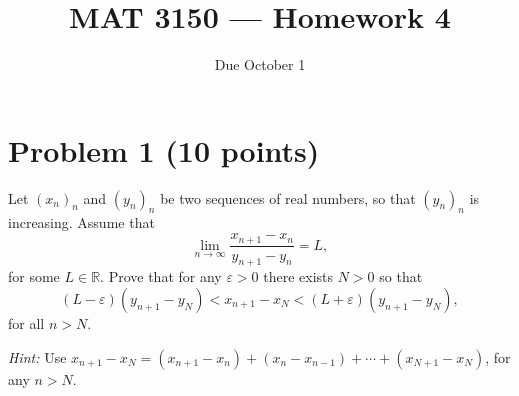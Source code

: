 \documentclass[11pt]{article}
\title{MAT 3150 --- Homework 4}
\author{}
\date{Due October 1}
\begin{document}
\maketitle

\section*{Problem 1 (10 points)}
Let $(x_n)_n$ and $(y_n)_n$ be two sequences of real numbers, so that
$(y_n)_n$ is increasing. Assume that
\[
  \lim_{n\to\infty}\frac{x_{n+1}-x_n}{y_{n+1}-y_n} = L,
\]
for some $L\in\mathbb{R}$. Prove that for any $\varepsilon>0$ there exists
$N>0$ so that
\[
  (L-\varepsilon)(y_{n+1}-y_N) < x_{n+1}-x_N < (L+\varepsilon)(y_{n+1}-y_N),
\]
for all $n>N$.

\noindent\emph{Hint:} Use
$x_{n+1}-x_N = (x_{n+1}-x_n)+(x_n-x_{n-1})+\cdots+(x_{N+1}-x_N)$, for any $n>N$.
\end{document}
